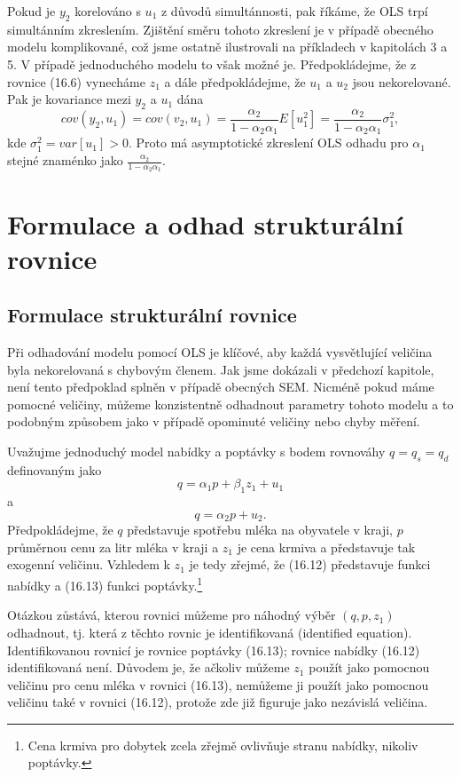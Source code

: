 Pokud je $y_2$ korelováno s $u_1$ z důvodů simultánnosti, pak říkáme, že OLS trpí simultánním zkreslením. Zjištění směru tohoto zkreslení je v případě obecného modelu komplikované, což jsme ostatně ilustrovali na příkladech v kapitolách 3 a 5. V případě jednoduchého modelu to však možné je. Předpokládejme, že z rovnice (16.6) vynecháme $z_1$ a dále předpokládejme, že $u_1$ a $u_2$ jsou nekorelované. Pak je kovariance mezi $y_2$ a $u_1$ dána
\begin{equation}
cov(y_2, u_1) = cov(v_2, u_1) = \frac{\alpha_2}{1 - \alpha_2 \alpha_1}E[u^2_1] = \frac{\alpha_2}{1 - \alpha_2 \alpha_1} \sigma_1^2,
\end{equation}
kde $\sigma_1^2 = var[u_1] > 0$. Proto má asymptotické zkreslení OLS odhadu pro $\alpha_1$ stejné znaménko jako $\frac{\alpha_2}{1 - \alpha_2 \alpha_1}$.

\section{Formulace a odhad strukturální rovnice}

\subsection{Formulace strukturální rovnice}

Při odhadování modelu pomocí OLS je klíčové, aby každá vysvětlující veličina byla nekorelovaná s chybovým členem. Jak jsme dokázali v předchozí kapitole, není tento předpoklad splněn v případě obecných SEM. Nicméně pokud máme pomocné veličiny, můžeme konzistentně odhadnout parametry tohoto modelu a to podobným způsobem jako v případě opominuté veličiny nebo chyby měření.

Uvažujme jednoduchý model nabídky a poptávky s bodem rovnováhy $q = q_s = q_d$ definovaným jako
\begin{equation}
q = \alpha_1 p + \beta_1 z_1 + u_1
\end{equation}
a
\begin{equation}
q = \alpha_2 p + u_2.
\end{equation}
Předpokládejme, že $q$ představuje spotřebu mléka na obyvatele v kraji, $p$ průměrnou cenu za litr mléka v kraji a $z_1$ je cena krmiva a představuje tak exogenní veličinu. Vzhledem k $z_1$ je tedy zřejmé, že (16.12) představuje funkci nabídky a (16.13) funkci poptávky.\footnote{Cena krmiva pro dobytek zcela zřejmě ovlivňuje stranu nabídky, nikoliv poptávky.} 

Otázkou zůstává, kterou rovnici můžeme pro náhodný výběr $(q, p, z_1)$ odhadnout, tj. která z těchto rovnic je identifikovaná (identified equation). Identifikovanou rovnicí je rovnice poptávky (16.13); rovnice nabídky (16.12) identifikovaná není. Důvodem je, že ačkoliv můžeme $z_1$ použít jako pomocnou veličinu pro cenu mléka v rovnici (16.13), nemůžeme ji použít jako pomocnou veličinu také v rovnici (16.12), protože zde již figuruje jako nezávislá veličina.

